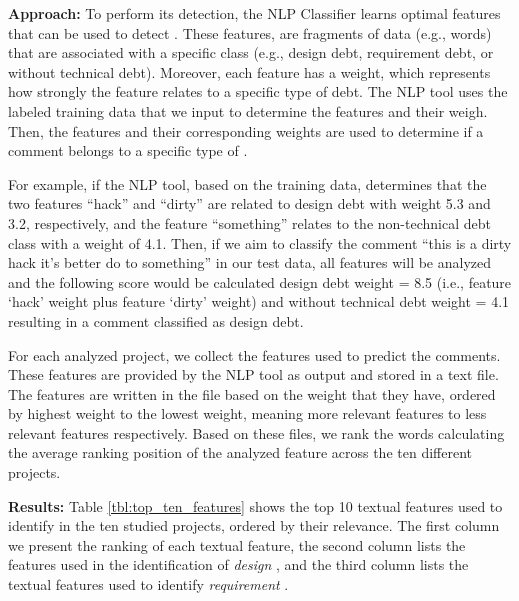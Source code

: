 \vspace{1mm}
\noindent \textbf{Approach:} To perform its detection, the NLP Classifier learns optimal features that can be used to detect \SATD. These features, are fragments of data (e.g., words) that are associated with a specific class (e.g., design debt, requirement debt, or without technical debt). Moreover, each feature has a weight, which represents how strongly the feature relates to a specific type of debt. The NLP tool uses the labeled training data that we input to determine the features and their weigh. Then, the features and their corresponding weights are used to determine if a comment belongs to a specific type of \SATD.

For example, if the NLP tool, based on the training data, determines that the two features ``hack'' and ``dirty'' are related to design debt with weight 5.3 and 3.2, respectively, and the feature ``something'' relates to the non-technical debt class with a weight of 4.1. Then, if we aim to classify the comment ``this is a dirty hack it's better do to something'' in our test data, all features will be analyzed and the following score would be calculated design debt weight = 8.5 (i.e., feature `hack' weight plus feature `dirty' weight) and without technical debt weight = 4.1 resulting in a comment classified as design debt.


For each analyzed project, we collect the features used to predict the \SATD comments. These features are provided by the NLP tool as output and stored in a text file. The features are written in the file based on the weight that they have, ordered by highest weight to the lowest weight, meaning more relevant features to less relevant features respectively. Based on these files, we rank the words calculating the average ranking position of the analyzed feature across the ten different projects. 


\noindent \textbf{Results:} Table \ref{tbl:top_ten_features} shows the top 10 textual features used to identify  \SATD in the ten studied projects, ordered by their relevance. The first column we present the ranking of each textual feature, the second column lists the features used in the identification of \emph{design} \SATD, and the third column lists the textual features used to identify \emph{requirement} \SATD.

